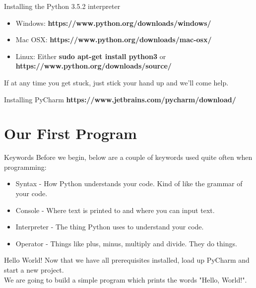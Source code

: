 \documentclass{beamer}
\begin{document}
\begin{frame}{Installing the Python 3.5.2 interpreter}
\begin{itemize}
  \item {
    Windows: \textbf{https://www.python.org/downloads/windows/}
  }
  \item {
    Mac OSX: \textbf{https://www.python.org/downloads/mac-osx/}
  }
  \item {
    Linux: Either \textbf{sudo apt-get install python3} or \textbf{https://www.python.org/downloads/source/}
  }
\end{itemize}

If at any time you get stuck, just stick your hand up and we'll come help.

\end{frame}

\begin{frame}{Installing PyCharm}
\textbf{https://www.jetbrains.com/pycharm/download/}
\end{frame}

\section*{Our First Program}

\begin{frame}{Keywords}
Before we begin, below are a couple of keywords used quite often when programming:
\begin{itemize}
  \item[] Syntax - How Python understands your code. Kind of like the grammar of your code.
  \item[] Console - Where text is printed to and where you can input text.
  \item[] Interpreter - The thing Python uses to understand your code.
  \item[] Operator - Things like plus, minus, multiply and divide. They do things.
\end{itemize}
\end{frame}

\begin{frame}{Hello World!}
Now that we have all prerequisites installed, load up PyCharm and start a new project.\\ \pause
We are going to build a simple program which prints the words "Hello, World!".
\end{frame}
\end{document}
